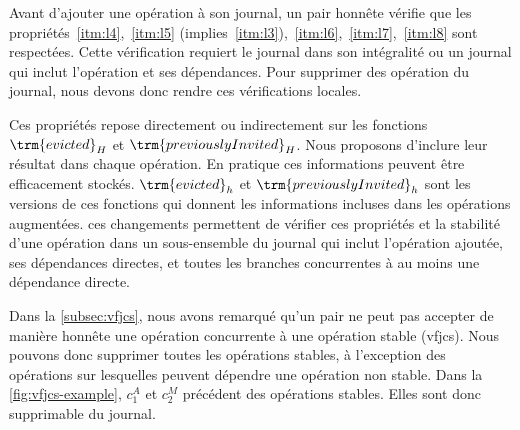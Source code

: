 Avant d'ajouter une opération à son journal, un pair honnête vérifie que les propriétés~\ref{itm:l4},~\ref{itm:l5} (implies~\ref{itm:l3}),~\ref{itm:l6},~\ref{itm:l7},~\ref{itm:l8} sont respectées.
Cette vérification requiert le journal dans son intégralité ou un journal qui inclut l'opération et ses dépendances.
Pour supprimer des opération du journal, nous devons donc rendre ces vérifications locales.

Ces propriétés repose directement ou indirectement sur les fonctions $\trm{evicted}_H$ et $\trm{previouslyInvited}_H$.
Nous proposons d'inclure leur résultat dans chaque opération.
En pratique ces informations peuvent être efficacement stockés.
$\trm{evicted}_h$ et $\trm{previouslyInvited}_h$ sont les versions de ces fonctions qui donnent les informations incluses dans les opérations augmentées.
ces changements permettent de vérifier ces propriétés et la stabilité d'une opération dans un sous-ensemble du journal qui inclut l'opération ajoutée, ses dépendances directes, et toutes les branches concurrentes à au moins une dépendance directe.


Dans la \autoref{subsec:vfjcs}, nous avons remarqué qu'un pair ne peut pas accepter de manière honnête une opération concurrente à une opération stable (\ac{vfjcs}).
Nous pouvons donc supprimer toutes les opérations stables, à l'exception des opérations sur lesquelles peuvent dépendre une opération non stable.
Dans la \autoref{fig:vfjcs-example}, $c^A_1$ et $c^M_2$ précédent des opérations stables.
Elles sont donc supprimable du journal.


